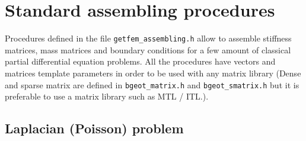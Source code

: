 \documentclass[11pt,a4paper]{article}
\begin{document}
\section{Standard assembling procedures}

Procedures defined in the file {\tt getfem\_assembling.h} allow to assemble stiffness matrices, mass matrices and boundary conditions for a few amount of classical partial differential equation problems. All the procedures have vectors and matrices template parameters in order to be used with any matrix library (Dense and sparse matrix are defined in {\tt bgeot\_matrix.h} and {\tt bgeot\_smatrix.h} but it is preferable to use a matrix library such as MTL / ITL.).

\subsection{Laplacian (Poisson) problem}
\end{document}
